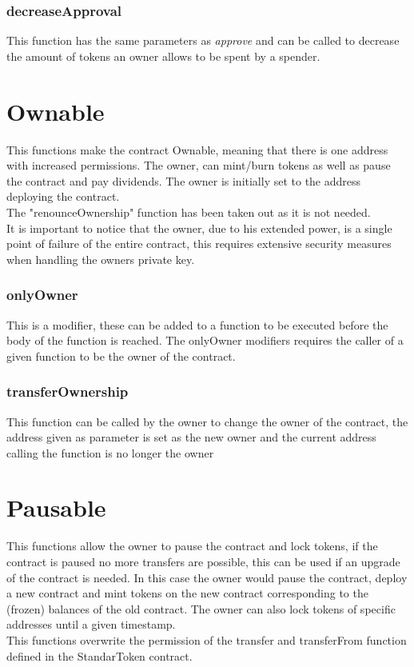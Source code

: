 \documentclass[12pt,a4paper]{article}
\begin{document}
\subsubsection*{decreaseApproval}
This function has the same parameters as \textit{approve} and can be called to decrease the amount of tokens an owner allows to be spent by a spender. 
\section*{Ownable}
This functions make the contract Ownable, meaning that there is one address with increased permissions. The owner, can mint/burn tokens as well as pause the contract and pay dividends. The owner is initially set to the address deploying the contract.\\
The "renounceOwnership" function has been taken out as it is not needed.\\
It is important to notice that the owner, due to his extended power, is a single point of failure of the entire contract, this requires extensive security measures when handling the owners private key. 
\subsubsection*{onlyOwner}
This is a modifier, these can be added to a function to be executed before the body of the function is reached. The onlyOwner modifiers requires the caller of a given function to be the owner of the contract. 
\subsubsection*{transferOwnership}
This function can be called by the owner to change the owner of the contract, the address given as parameter is set as the new owner and the current address calling the function is no longer the owner
\section*{Pausable}
This functions allow the owner to pause the contract and lock tokens, if the contract is paused no more transfers are possible, this can be used if an upgrade of the contract is needed. In this case the owner would pause the contract, deploy a new contract and mint tokens on the new contract corresponding to the (frozen) balances of the old contract. The owner can also lock tokens of specific addresses until a given timestamp.\\
This functions overwrite the permission of the transfer and transferFrom function defined in the StandarToken contract.
\end{document}
